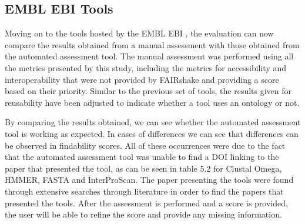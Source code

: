 \documentclass{cisfyp}
\begin{document}
\subsection{EMBL EBI Tools}
Moving on to the tools hosted by the EMBL EBI \cite{ebi}, the evaluation can now compare the results obtained from a manual assessment with those obtained from the automated assessment tool. The manual assessment was performed using all the metrics presented by this study, including the metrics for accessibility and interoperability that were not provided by FAIRshake and providing a score based on their priority. Similar to the previous set of tools, the results given for reusability have been adjusted to indicate whether a tool uses an ontology or not.

\begin{table}[h]
\caption{Comparison of results between a manual assessment performed on EMBL EBI tools and assessment performed by the automated assessment tool.}
\label{tab:my-table}
\end{table}

By comparing the results obtained, we can see whether the automated assessment tool is working as expected. In cases of differences we can see that differences can be observed in findability scores. All of these occurrences were due to the fact that the automated assessment tool was unable to find a DOI linking to the paper that presented the tool, as can be seen in table 5.2 for Clustal Omega, HMMER, FASTA and InterProScan. The paper presenting the tools were found through extensive searches through literature in order to find the papers that presented the tools. After the assessment is performed and a score is provided, the user will be able to refine the score and provide any missing information.
\end{document}
